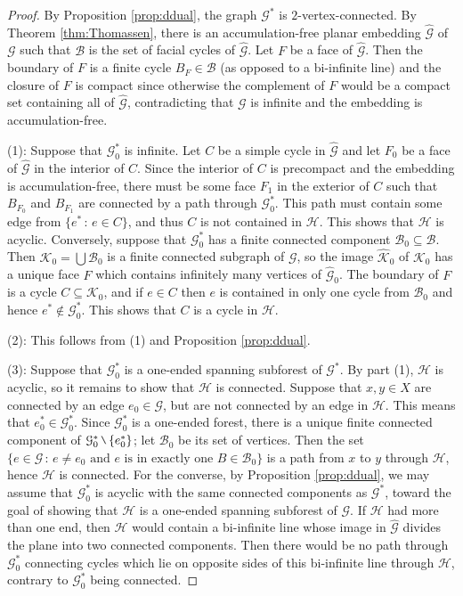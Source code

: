 \documentclass[11pt]{amsart}
\theoremstyle{definition}
\theoremstyle{plain}
\newcommand{\<}{\langle}
\renewcommand{\>}{\rangle}
\newcommand{\mc}[1]{\mathcal{#1}}
\newcommand{\wh}[1]{\widehat{#1}}
\newcommand{\Ggraph}{\mathcal{G}}
\newcommand{\Hgraph}{\mathcal{H}}
\newcommand{\Kgraph}{\mathcal{K}}
\newcommand{\mysetminusD}{\hbox{\tikz{\draw[line width=0.6pt,line cap=round] (3pt,0) -- (0,6pt);}}}
\newcommand{\mysetminusT}{\mysetminusD}
\newcommand{\mysetminusS}{\hbox{\tikz{\draw[line width=0.45pt,line cap=round] (2pt,0) -- (0,4pt);}}}
\newcommand{\mysetminusSS}{\hbox{\tikz{\draw[line width=0.4pt,line cap=round] (1.5pt,0) -- (0,3pt);}}}
\newcommand{\mysetminus}{\mathbin{\mathchoice{\mysetminusD}{\mysetminusT}{\mysetminusS}{\mysetminusSS}}}%
\begin{document}
\begin{proof}
By Proposition \ref{prop:ddual}, the graph ${\Ggraph}^*$ is $2$-vertex-connected. 
By Theorem \ref{thm:Thomassen}, there is an accumulation-free planar embedding $\wh{{\Ggraph}}$ of ${\Ggraph}$ such that $\mc{B}$ is the set of facial cycles of $\wh{{\Ggraph}}$. Let $F$ be a face of $\wh{{\Ggraph}}$. Then the boundary of $F$ is a finite cycle $B_F\in \mc{B}$ (as opposed to a bi-infinite line) and the closure of $F$ is compact since otherwise the complement of $F$ would be a compact set containing all of $\wh{{\Ggraph}}$, contradicting that ${\Ggraph}$ is infinite and the embedding is accumulation-free.

(1): Suppose that ${\Ggraph}_0 ^*$ is infinite. Let $C$ be a simple cycle in $\wh{{\Ggraph}}$ and let $F_0$ be a face of $\wh{{\Ggraph}}$ in the interior of $C$. Since the interior of $C$ is precompact and the embedding is accumulation-free, there must be some face $F_1$ in the exterior of $C$ such that $B_{F_0}$ and $B_{F_1}$ are connected by a path through ${\Ggraph}_0^*$. This path must contain some edge from $\{ e^*\, : \, e\in C \}$, and thus $C$ is not contained in ${\Hgraph}$. This shows that ${\Hgraph}$ is acyclic. Conversely, suppose that ${\Ggraph}_0^*$ has a finite connected component $\mc{B}_0\subseteq \mc{B}$. Then ${\Kgraph} _0 = \bigcup \mc{B}_0$ is a finite connected subgraph of ${\Ggraph}$, so the image $\wh{{\Kgraph}}_0$ of ${\Kgraph}_0$ has a unique face $F$ which contains infinitely many vertices of $\wh{{\Ggraph}}_0$. The boundary of $F$ is a cycle $C\subseteq {\Kgraph}_0$, and if $e\in C$ then $e$ is contained in only one cycle from $\mc{B}_0$ and hence $e^*\not\in {\Ggraph}_0^*$. This shows that $C$ is a cycle in ${\Hgraph}$.

(2): This follows from (1) and Proposition \ref{prop:ddual}.

(3): Suppose that ${\Ggraph}_0^*$ is a one-ended spanning subforest of ${\Ggraph}^*$. By part (1), ${\Hgraph}$ is acyclic, so it remains to show that ${\Hgraph}$ is connected. Suppose that $x,y\in X$ are connected by an edge $e_0\in {\Ggraph}$, but are not connected by an edge in ${\Hgraph}$. This means that $e_0^*\in {\Ggraph}_0^*$. Since ${\Ggraph}_0^*$ is a one-ended forest, there is a unique finite connected component of ${\Ggraph}_0^* \mysetminus \{ e_0 ^* \}$; let $\mc{B}_0$ be its set of vertices. Then the set $\{ e\in {\Ggraph} \, : \, e\neq e_0 \text{ and }e\text{ is in exactly one } B\in \mc{B}_0 \}$ is a path from $x$ to $y$ through ${\Hgraph}$, hence ${\Hgraph}$ is connected.
For the converse, by Proposition \ref{prop:ddual}, we may assume that ${\Ggraph}_0^*$ is acyclic with the same connected components as ${\Ggraph}^*$, toward the goal of showing that ${\Hgraph}$ is a one-ended spanning subforest of $\Ggraph$. If $\Hgraph$ had more than one end, then ${\Hgraph}$ would contain a bi-infinite line whose image in $\wh{{\Ggraph}}$ divides the plane into two connected components. Then there would be no path through ${\Ggraph}_0^*$ connecting cycles which lie on opposite sides of this bi-infinite line through $\Hgraph$, contrary to ${\Ggraph}_0^*$ being connected.
\end{proof}
\end{document}
